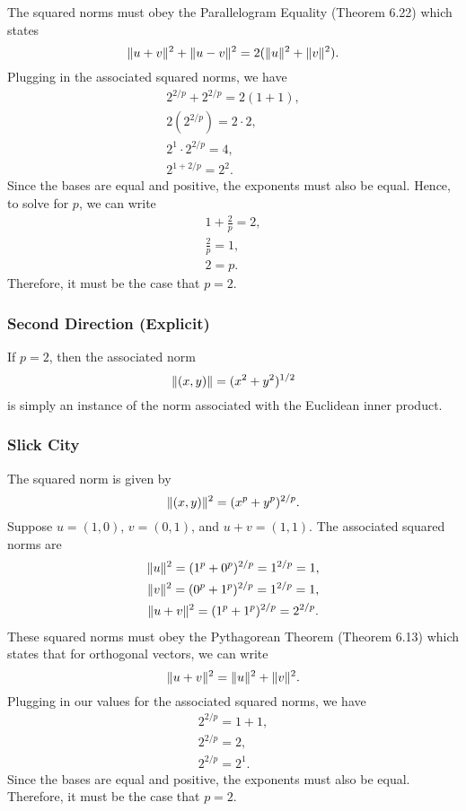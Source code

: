 \documentclass{article}
\begin{document}
The squared norms must obey the Parallelogram Equality (Theorem 6.22) which states
\[\lVert u+v\rVert^2+\lVert u-v\rVert^2=2(\lVert u\rVert^2+\lVert v\rVert^2).\]
Plugging in the associated squared norms, we have
\begin{gather*}
    2^{2/p}+2^{2/p}=2(1+1),\\
    2(2^{2/p})=2\cdot 2,\\
    2^1\cdot 2^{2/p}=4,\\
    2^{1+2/p}=2^2.
\end{gather*}
Since the bases are equal and positive, the exponents must also be equal. 
Hence, to solve for $p$, we can write
\begin{gather*}
    1+\frac{2}{p}=2,\\
    \frac{2}{p}=1,\\
    2=p.
\end{gather*}
Therefore, it must be the case that $p=2$.

\subsubsection*{Second Direction (Explicit)}
If $p=2$, then the associated norm 
\[\lVert(x,y)\rVert=(x^2+y^2)^{1/2}\]
is simply an instance of the norm associated with the Euclidean inner product.

\subsubsection*{Slick City}
The squared norm is given by 
\[\lVert(x,y)\rVert^2=(x^p+y^p)^{2/p}.\]
Suppose $u=(1,0)$, $v=(0,1)$, and $u+v=(1,1)$. 
The associated squared norms are
\begin{gather*}
    \lVert u\rVert^2=(1^p+0^p)^{2/p}=1^{2/p}=1,\\
    \lVert v\rVert^2=(0^p+1^p)^{2/p}=1^{2/p}=1,\\
    \lVert u+v\rVert^2=(1^p+1^p)^{2/p}=2^{2/p}.
\end{gather*}
These squared norms must obey the Pythagorean Theorem (Theorem 6.13) which states that for orthogonal vectors, we can write
\[\lVert u+v\rVert^2=\lVert u\rVert^2+\lVert v\rVert^2.\]
Plugging in our values for the associated squared norms, we have
\begin{gather*}
    2^{2/p}=1+1,\\
    2^{2/p}=2,\\
    2^{2/p}=2^1.
\end{gather*}
Since the bases are equal and positive, the exponents must also be equal. 
Therefore, it must be the case that $p=2$.
\end{document}
